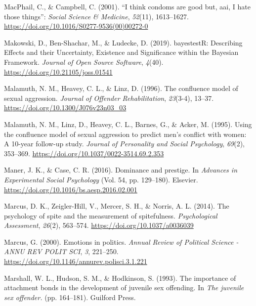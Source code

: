 \documentclass[
  donotrepeattitle,doc, 12pt, a4paper,floatsintext]{apa7}
\newlength{\cslhangindent}
\newlength{\cslentryspacingunit} %
\newenvironment{CSLReferences}[2] %
 {%
  \setlength{\parindent}{0pt}
  \ifodd #1
  \let\oldpar\par
  \def\par{\hangindent=\cslhangindent\oldpar}
  \fi
  \setlength{\parskip}{#2\cslentryspacingunit}
 }%
 {}
\begin{document}
\begin{CSLReferences}{1}{0}
\leavevmode{}%
MacPhail, C., \& Campbell, C. (2001). {``I think condoms are good but, aai, I hate those things''}: \emph{Social Science \& Medicine}, \emph{52}(11), 1613--1627. \url{https://doi.org/10.1016/S0277-9536(00)00272-0}

\leavevmode{}%
Makowski, D., Ben-Shachar, M., \& Ludecke, D. (2019). bayestestR: Describing Effects and their Uncertainty, Existence and Significance within the Bayesian Framework. \emph{Journal of Open Source Software}, \emph{4}(40). \url{https://doi.org/10.21105/joss.01541}

\leavevmode{}%
Malamuth, N. M., Heavey, C. L., \& Linz, D. (1996). The confluence model of sexual aggression. \emph{Journal of Offender Rehabilitation}, \emph{23}(3-4), 13--37. \url{https://doi.org/10.1300/J076v23n03_03}

\leavevmode{}%
Malamuth, N. M., Linz, D., Heavey, C. L., Barnes, G., \& Acker, M. (1995). Using the confluence model of sexual aggression to predict men's conflict with women: A 10-year follow-up study. \emph{Journal of Personality and Social Psychology}, \emph{69}(2), 353--369. \url{https://doi.org/10.1037/0022-3514.69.2.353}

\leavevmode{}%
Maner, J. K., \& Case, C. R. (2016). Dominance and prestige. In \emph{Advances in Experimental Social Psychology} (Vol. 54, pp. 129--180). Elsevier. \url{https://doi.org/10.1016/bs.aesp.2016.02.001}

\leavevmode{}%
Marcus, D. K., Zeigler-Hill, V., Mercer, S. H., \& Norris, A. L. (2014). The psychology of spite and the measurement of spitefulness. \emph{Psychological Assessment}, \emph{26}(2), 563--574. \url{https://doi.org/10.1037/a0036039}

\leavevmode{}%
Marcus, G. (2000). Emotions in politics. \emph{Annual Review of Political Science - ANNU REV POLIT SCI}, \emph{3}, 221--250. \url{https://doi.org/10.1146/annurev.polisci.3.1.221}

\leavevmode{}%
Marshall, W. L., Hudson, S. M., \& Hodkinson, S. (1993). The importance of attachment bonds in the development of juvenile sex offending. In \emph{The juvenile sex offender.} (pp. 164--181). Guilford Press.


\end{CSLReferences}
\end{document}
